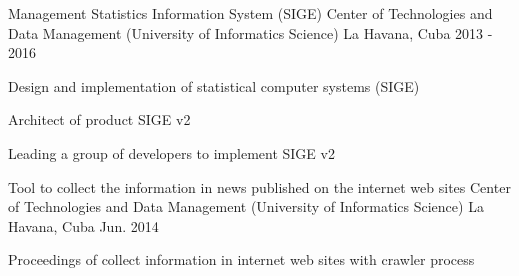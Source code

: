 \begin{cventries}
\cventry
{Management Statistics Information System (SIGE)} %
{Center of Technologies and Data Management (University of Informatics Science)} %
{La Havana, Cuba} %
{2013 - 2016} %
{ %
\begin{cvitems}
\item {Design and implementation of statistical computer systems (SIGE)}
\item {Architect of product SIGE v2}
\item {Leading a group of developers to implement SIGE v2}
\end{cvitems}
}


\cventry
{Tool to collect the information in news published on the internet web sites} %
{Center of Technologies and Data Management (University of Informatics Science)} %
{La Havana, Cuba} %
{Jun. 2014} %
{ %
\begin{cvitems}
\item {Proceedings of collect information in internet web sites with crawler process}
\end{cvitems}
}


\end{cventries}


